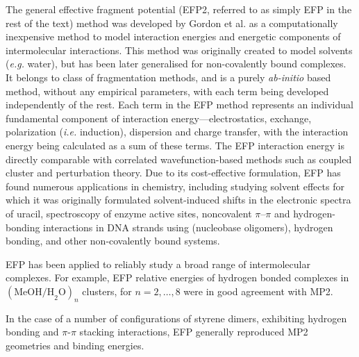 The general effective fragment potential (EFP2, referred to as simply EFP in the rest of the text) method was developed by Gordon et al. 
\cite{Jensen1998a, Gordon2001a, Gordon2009a, Mullin2009a, Gordon2012a} 
as a computationally inexpensive method to model interaction energies and energetic components of intermolecular interactions. 
This method was originally created to model solvents (\emph{e.g.} water),
\cite{Day1996a, Chen1996a, Adamovic2006a} 
but has been later generalised for non-covalently bound complexes.
\cite{Gordon2007a, Ghosh2010a}
It belongs to class of fragmentation methods, and is a purely \emph{ab-initio} based method, without any empirical parameters, with each term being developed independently of the rest. 
Each term in the EFP method represents an individual fundamental component of interaction energy---electrostatics, exchange, polarization (\emph{i.e.} induction), dispersion and charge transfer, with the interaction energy being calculated as a sum of these terms. The EFP interaction energy is directly comparable with correlated wavefunction-based methods such as coupled cluster and perturbation theory.
Due to its cost-effective formulation, EFP has found numerous applications in chemistry, including studying solvent effects for which it was originally formulated
\cite{Chen1996a, Day1996a, Day1997a, Krauss1997a, Merrill1998a, Day2000a, Adamovic2006a}
solvent-induced shifts in the electronic spectra of uracil,
\cite{DeFusco2011a}
spectroscopy of enzyme active sites,
\cite{Krauss1995a, Krauss1998a}
noncovalent $\pi$--$\pi$ and hydrogen-bonding interactions in DNA strands using (nucleobase oligomers),
\cite{Ghosh2010a}
hydrogen bonding,
\cite{Jensen1994a}
and other non-covalently bound systems.
\cite{Gordon2009a, Gordon2013a, Wladkowski1995a}

EFP has been applied to reliably study a broad range of intermolecular complexes. For example, EFP relative energies of hydrogen bonded complexes in $ (\text{MeOH/H}_2\text{O})_{n} $ clusters, for $ n = 2, \ldots, 8 $ were in good agreement with MP2.
\cite{Adamovic2006a}

In the case of a number of configurations of styrene dimers, exhibiting hydrogen bonding and  $\pi$-$\pi$ stacking interactions, EFP generally reproduced MP2 geometries and binding energies.
\cite{Adamovic2006b}


